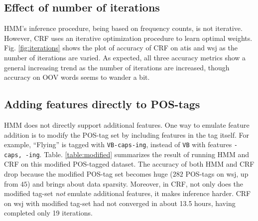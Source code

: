 \documentclass{sig-alternate-05-2015}
\begin{document}
\subsection{Effect of number of iterations}
HMM's inference procedure, being based on frequency counts, is not iterative. However, CRF uses an iterative optimization procedure to learn optimal weights. Fig. \ref{fig:iterations} shows the plot of accuracy of CRF on atis and wsj as the number of iterations are varied. As expected, all three accuracy metrics show a general increasing trend as the number of iterations are increased, though accuracy on OOV words seems to wander a bit.

\subsection{Adding features directly to POS-tags}
HMM does not directly support additional features. One way to emulate feature addition is to modify the POS-tag set by including features in the tag itself. For example, ``Flying'' is tagged with \texttt{VB-caps-ing}, instead of \texttt{VB} with features \texttt{-caps, -ing}. Table. \ref{table:modified} summarizes the result of running HMM and CRF on this modified POS-tagged dataset. The accuracy of both HMM and CRF drop because the modified POS-tag set becomes huge ($282$ POS-tags on wsj, up from $45$) and brings about data sparsity. Moreover, in CRF, not only does the modified tag-set \emph{not} emulate additional features, it makes inference harder. CRF on wsj with modified tag-set had not converged in about 13.5 hours, having completed only 19 iterations.
\end{document}
